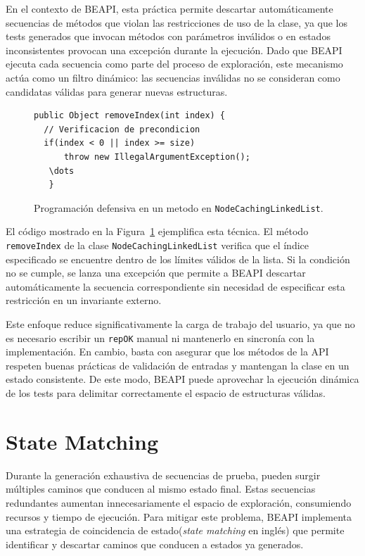 En el contexto de \textsf{BEAPI}, esta práctica permite descartar automáticamente secuencias de métodos que violan las restricciones de uso 
de la clase, ya que los tests generados que invocan métodos con parámetros inválidos o en estados inconsistentes provocan una excepción 
durante la ejecución. Dado que \textsf{BEAPI} ejecuta cada secuencia como parte del proceso de exploración, este mecanismo actúa 
como un filtro dinámico: las secuencias inválidas no se consideran como candidatas válidas para generar nuevas estructuras.

\begin{figure}[!htb]
\begin{lstlisting}
public Object removeIndex(int index) {
  // Verificacion de precondicion
  if(index < 0 || index >= size)
      throw new IllegalArgumentException();  
   \dots
   }
\end{lstlisting}
\caption{Programación defensiva en un metodo en \texttt{NodeCachingLinkedList}.}
\label{fig:algoProgDefensiva}
\end{figure}

El código mostrado en la Figura~\ref{fig:algoProgDefensiva} ejemplifica esta técnica. 
El método \texttt{removeIndex} de la clase \texttt{NodeCachingLinkedList} verifica que el índice especificado se encuentre dentro de los límites válidos de la lista. 
Si la condición no se cumple, se lanza una excepción que permite a \textsf{BEAPI} descartar automáticamente la secuencia correspondiente 
sin necesidad de especificar esta restricción en un invariante externo.

Este enfoque reduce significativamente la carga de trabajo del usuario, ya que no es necesario escribir un \texttt{repOK} manual ni mantenerlo 
en sincronía con la implementación. En cambio, basta con asegurar que los métodos de la API respeten buenas prácticas de validación 
de entradas y mantengan la clase en un estado consistente. 
De este modo, \textsf{BEAPI} puede aprovechar la ejecución dinámica de los tests para delimitar correctamente el espacio de estructuras válidas.


\section{State Matching}
\label{sec:stateMatching}
Durante la generación exhaustiva de secuencias de prueba, pueden surgir múltiples caminos que conducen al mismo estado final. 
Estas secuencias redundantes aumentan innecesariamente el espacio de exploración, consumiendo recursos y tiempo de ejecución. 
Para mitigar este problema, \textsf{BEAPI} implementa una estrategia de coincidencia de estado(\emph{state matching} en inglés) que permite identificar y descartar caminos que conducen a estados ya generados.

